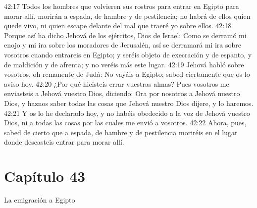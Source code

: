 42:17 Todos los hombres que volvieren sus rostros para entrar en Egipto para morar allí, morirán a espada, de hambre y de pestilencia; no habrá de ellos quien quede vivo, ni quien escape delante del mal que traeré yo sobre ellos. 
42:18 Porque así ha dicho Jehová de los ejércitos, Dios de Israel: Como se derramó mi enojo y mi ira sobre los moradores de Jerusalén, así se derramará mi ira sobre vosotros cuando entrareis en Egipto; y seréis objeto de execración y de espanto, y de maldición y de afrenta; y no veréis más este lugar. 
42:19 Jehová habló sobre vosotros, oh remanente de Judá: No vayáis a Egipto; sabed ciertamente que os lo aviso hoy. 
42:20 ¿Por qué hicisteis errar vuestras almas? Pues vosotros me enviasteis a Jehová vuestro Dios, diciendo: Ora por nosotros a Jehová nuestro Dios, y haznos saber todas las cosas que Jehová nuestro Dios dijere, y lo haremos. 
42:21 Y os lo he declarado hoy, y no habéis obedecido a la voz de Jehová vuestro Dios, ni a todas las cosas por las cuales me envió a vosotros. 
42:22 Ahora, pues, sabed de cierto que a espada, de hambre y de pestilencia moriréis en el lugar donde deseasteis entrar para morar allí. 
\section*{Capítulo 43 }
La emigración a Egipto 
 
